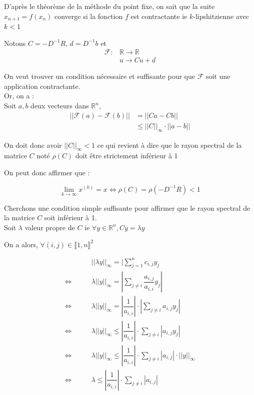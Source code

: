\documentclass[11pt, a4paper]{article}
\begin{document}
D'après le théorème de la méthode du point fixe, on sait que la suite $x_{n+1} = f(x_n)$ converge si la fonction $f$ est contractante ie $k$-lipshitzienne avec $k < 1$

Notons $C = -D^{-1}R$, $d = D^{-1}b$ et 
\begin{align*}
    \mathcal{F} : &\mathbb{R} \longrightarrow \mathbb{R} \\
    &u \longrightarrow Cu + d
\end{align*}

On veut trouver un condition nécessaire et suffisante pour que $\mathcal{F}$ soit une application contractante.\\
Or, on a :\\

Soit $a,b$ deux vecteurs dans $\mathbb{R}^n$,\\
\begin{align*}
    ||\mathcal{F}(a) - \mathcal{F}(b)|| &= ||Ca - Cb||\\
    &\leq||C||_{\infty} \cdot ||a-b||
\end{align*}

On doit donc avoir $||C||_{\infty} < 1$ ce qui revient à dire que le rayon spectral de la matrice $C$ noté $\rho(C)$ doit \^etre strictement inférieur à 1

On peut donc affirmer que :

\[
\lim_{k \to \infty}x^{(k)} = x \Leftrightarrow \rho(C) = \rho(-D^{-1}R) < 1
\]

Cherchons une condition simple suffisante pour affirmer que le rayon spectral de la matrice $C$ soit inférieur à 1.\\

Soit $\lambda$ valeur propre de $C$ ie $\forall y \in \mathbb{R}^n, Cy = \lambda y$

On a alors, $\forall (i,j) \in \llbracket 1,n \rrbracket^2$

\begin{align*}
    &||\lambda y||_{\infty} = |\sum_{j=1}^{n}c_{i,j}y_j\\
    \Leftrightarrow \qquad & \lambda||y||_{\infty} = |\sum_{j \neq i}\dfrac{a_{i,j}}{a_{i,i}}y_j|\\
    \Leftrightarrow \qquad & \lambda||y||_{\infty} = |\dfrac{1}{a_{i,i}}| \cdot |\sum_{j \neq i}a_{i,j}y_j|\\
    \Leftrightarrow \qquad & \lambda||y||_{\infty} \leq |\dfrac{1}{a_{i,i}}| \cdot \sum_{j \neq i}|a_{i,j}y_j|\\
    \Leftrightarrow \qquad & \lambda||y||_{\infty} \leq |\dfrac{1}{a_{i,i}}| \cdot \sum_{j \neq i}|a_{i,j}| \cdot ||y||_{\infty}\\
    \Leftrightarrow \qquad & \lambda \leq |\dfrac{1}{a_{i,i}}| \cdot \sum_{j \neq i}|a_{i,j}|
\end{align*}
\end{document}
